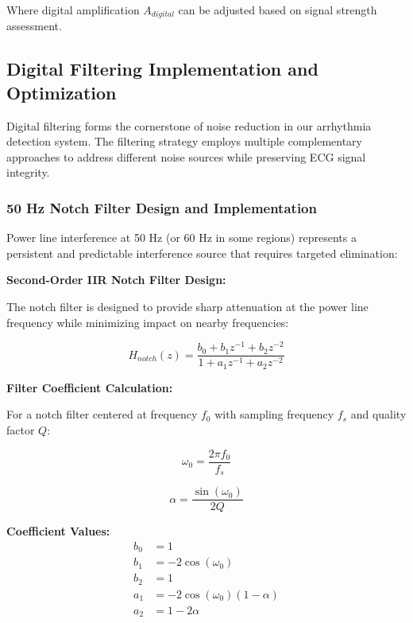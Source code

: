 \documentclass[12pt,a4paper]{article}
\begin{document}
Where digital amplification $A_{digital}$ can be adjusted based on signal strength assessment.

\subsection{Digital Filtering Implementation and Optimization}

Digital filtering forms the cornerstone of noise reduction in our arrhythmia detection system. The filtering strategy employs multiple complementary approaches to address different noise sources while preserving ECG signal integrity.

\subsubsection{50 Hz Notch Filter Design and Implementation}

Power line interference at 50 Hz (or 60 Hz in some regions) represents a persistent and predictable interference source that requires targeted elimination:

\vspace{0.5cm}

\textbf{Second-Order IIR Notch Filter Design:}

The notch filter is designed to provide sharp attenuation at the power line frequency while minimizing impact on nearby frequencies:

\begin{equation*}
H_{notch}(z) = \frac{b_0 + b_1 z^{-1} + b_2 z^{-2}}{1 + a_1 z^{-1} + a_2 z^{-2}}
\end{equation*}

\textbf{Filter Coefficient Calculation:}

For a notch filter centered at frequency $f_0$ with sampling frequency $f_s$ and quality factor $Q$:

\begin{equation*}
\omega_0 = \frac{2\pi f_0}{f_s}
\end{equation*}

\begin{equation*}
\alpha = \frac{\sin(\omega_0)}{2Q}
\end{equation*}

\textbf{Coefficient Values:}
\begin{align*}
b_0 &= 1\\
b_1 &= -2\cos(\omega_0)\\
b_2 &= 1\\
a_1 &= -2\cos(\omega_0)(1-\alpha)\\
a_2 &= 1-2\alpha
\end{align*}
\end{document}
